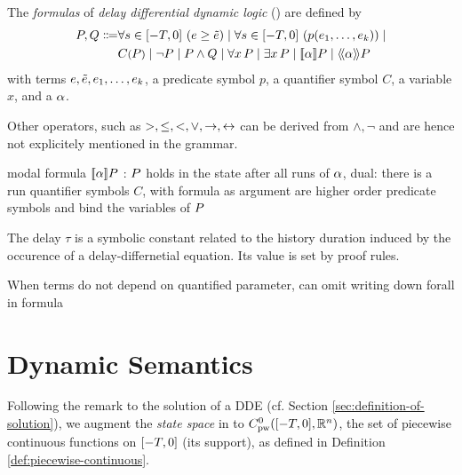     \begin{definition}\label{def:syntax-formula}
        The \emph{formulas} of \emph{delay differential dynamic logic} (\ddL) are defined by
        \begin{align}
            \asfml,\bsfml \Coloneqq
                &\holdssince{T}{\astrm\geq\bstrm} \mid
                \holdssince{T}{p(\range{\istrm{1}}{\istrm{k}})} \mid\\
                &\contextapp{C}{\asfml} \mid
                \lnot\asfml \mid
                \asfml\land\bsfml \mid
                \lforall{x}{\asfml} \mid
                \lexists{x}{\asfml} \mid
                \dbox{\asprg}{\asfml} \mid
                \ddiamond{\asprg}{\asfml}
        \end{align}
        with terms $e,\tilde{e},e_{1},\ldots,e_{k}$,
        a predicate symbol $p$, a quantifier symbol $C$, a variable $x$, and a \HP $\alpha$.
        
        Other operators, such as $>,\leq,<,\lor,\rightarrow,\leftrightarrow$ can be derived from $\land,\lnot$ and are hence not explicitely mentioned in the grammar.

        modal formula $\dbox{\asprg}{\asfml}$ : $P$ holds in the state after all runs of $\alpha$, dual: there is a run
        quantifier symbols $C$, with formula as argument are higher order predicate symbols and bind the variables of $P$

        The delay $\tau$ is a symbolic constant related to the history duration induced by the occurence of a delay-differnetial equation. Its value is set by proof rules.
    \end{definition}

    When terms do not depend on quantified parameter, can omit writing down forall in formula

\section{Dynamic Semantics}
    \label{sec:dynamic-semantics}

    Following the remark to the solution of a DDE (cf. Section \ref{sec:definition-of-solution}), we augment the \emph{state space} in \dL to $\statespace$, the set of piecewise continuous functions on $[-T,0]$ (its support), as defined in Definition \ref{def:piecewise-continuous}.


